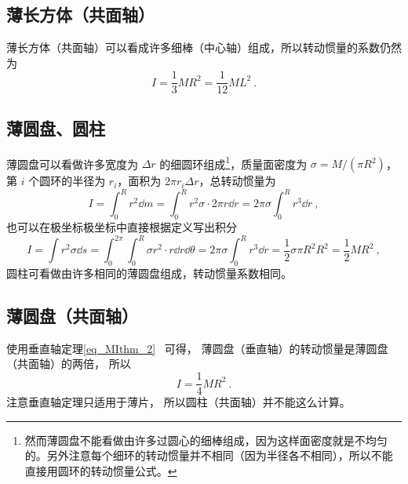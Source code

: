 \subsection{薄长方体（共面轴）}
薄长方体（共面轴）可以看成许多细棒（中心轴）组成，所以转动惯量的系数仍然为
\begin{equation}\label{eq_ExMI_8} 
I = \frac{1}{3} MR^2 = \frac{1}{12}ML^2~.
\end{equation}

\subsection{薄圆盘、圆柱}
薄圆盘可以看做许多宽度为 $\Delta r$ 的细圆环组成\footnote{然而薄圆盘不能看做由许多过圆心的细棒组成，因为这样面密度就是不均匀的。另外注意每个细环的转动惯量并不相同（因为半径各不相同），所以不能直接用圆环的转动惯量公式。}，质量面密度为 $\sigma  = M/(\pi R^2)$，第 $i$ 个圆环的半径为 $r_i$，面积为 $2\pi r_i \Delta {r}$，总转动惯量为
\begin{equation}
I = \int_0^R r^2 \dd{m}  = \int_0^R r^2 \sigma  \cdot 2\pi r \dd{r}  = 2\pi \sigma \int_0^R r^3 \dd{r}~,
\end{equation}
也可以在极坐标极坐标中直接根据定义写出积分
\begin{equation}
I = \int {r^2}\sigma \dd{s}  = \int_0^{2\pi } \int_0^R \sigma r^2 \cdot r \dd{r}\dd{\theta}  = 2\pi \sigma \int_0^R r^3 \dd{r}  = \frac12\sigma \pi R^2 R^2 = \frac12 M R^2~,
\end{equation}
圆柱可看做由许多相同的薄圆盘组成，转动惯量系数相同。

\subsection{薄圆盘（共面轴）}
使用垂直轴定理\autoref{eq_MIthm_2}~ 可得， 薄圆盘（垂直轴）的转动惯量是薄圆盘（共面轴）的两倍， 所以
\begin{equation}
I = \frac{1}{4}MR^2~.
\end{equation}
注意垂直轴定理只适用于薄片， 所以圆柱（共面轴）并不能这么计算。

